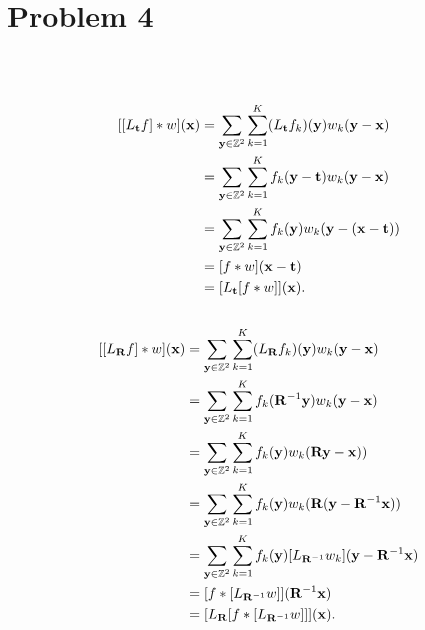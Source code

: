\section{Problem 4}~\label{sec:prob4}

\subsection{} %

\begin{equation}
\begin{split}
[[L_\bt f] * w](\bx)
    & = \sum_{\by\in \zz^2}\sum_{k=1}^K (L_\bt f_k)(\by) w_k(\by-\bx)  \\
    & = \sum_{\by\in \zz^2}\sum_{k=1}^K f_k(\by-\bt) w_k(\by-\bx)  \\
    & = \sum_{\by\in \zz^2}\sum_{k=1}^K f_k(\by) w_k(\by-(\bx-\bt))  \\
    & = [ f * w](\bx-\bt) \\
    & = [L_\bt[ f * w]](\bx).
\end{split}
\end{equation}

\subsection{} %

\begin{equation}
\begin{split}
[[L_\bR f] * w](\bx)
    & = \sum_{\by\in \zz^2}\sum_{k=1}^K (L_\bR f_k)(\by) w_k(\by-\bx)  \\
    & = \sum_{\by\in \zz^2}\sum_{k=1}^K f_k(\bR^{-1} \by) w_k(\by-\bx)  \\
    & = \sum_{\by\in \zz^2}\sum_{k=1}^K f_k(\by) w_k(\bR\by-\bx))  \\
    & = \sum_{\by\in \zz^2}\sum_{k=1}^K f_k(\by) w_k(\bR(\by-\bR^{-1} \bx))  \\
    & = \sum_{\by\in \zz^2}\sum_{k=1}^K f_k(\by) [L_{\bR^{-1}} w_k](\by-\bR^{-1} \bx)  \\
    & = [ f *  [L_{\bR^{-1}} w]](\bR^{-1} \bx) \\
    & = [L_\bR[ f * [L_{\bR^{-1}} w]]](\bx).
\end{split}
\end{equation}

\subsection{} %

